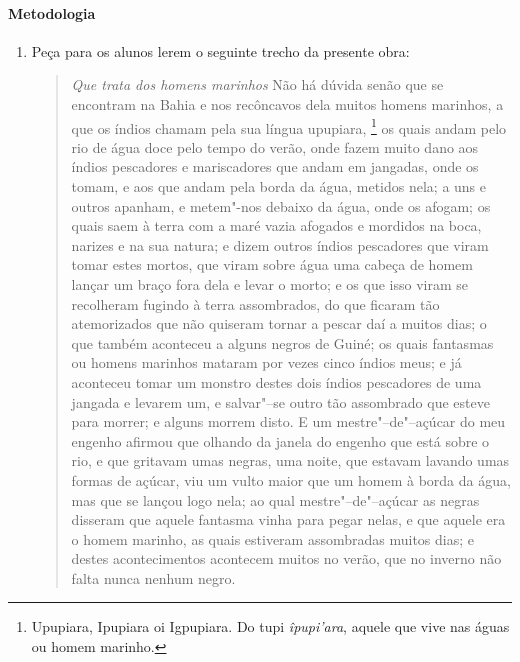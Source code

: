 \documentclass[12pt]{extarticle}
\begin{document}
{\paragraph{Metodologia}

\begin{enumerate}

\item Peça para os alunos lerem o seguinte trecho da presente obra:

\begin{quote} 
\emph{Que trata dos homens marinhos}
Não há dúvida senão que se encontram na Bahia e nos recôncavos dela 
muitos homens marinhos, a que os índios chamam pela sua língua upupiara,
\footnote{Upupiara, Ipupiara oi Igpupiara. Do tupi \textit{îpupi'ara}, 
aquele que vive nas águas ou homem marinho.} os quais andam pelo rio de 
água doce pelo tempo do verão, onde fazem muito dano aos índios
pescadores e mariscadores que andam em jangadas, onde os tomam, e aos que 
andam pela borda da água, metidos nela; a uns e outros apanham, e metem"-nos 
debaixo da água, onde os afogam; os quais saem à terra com a maré vazia 
afogados e mordidos na boca, narizes e na sua natura; e dizem outros índios pescadores que viram tomar estes mortos, que viram sobre água uma cabeça 
de homem lançar um braço fora dela e levar o morto; e os que isso viram 
se recolheram fugindo à terra assombrados, do que ficaram tão atemorizados 
que não quiseram tornar a pescar daí a muitos dias; o que também aconteceu 
a alguns negros de Guiné; os quais fantasmas ou homens marinhos mataram 
por vezes cinco índios meus; e já aconteceu tomar um monstro destes dois 
índios pescadores de uma jangada e levarem um, e salvar"--se outro tão 
assombrado que esteve para morrer; e alguns morrem disto. E um 
mestre"--de"--açúcar do meu engenho afirmou que olhando da janela do engenho 
que está sobre o rio, e que gritavam umas negras, uma noite, que estavam 
lavando umas formas de açúcar, viu um vulto maior que um homem à borda da 
água, mas que se lançou logo nela; ao qual mestre"--de"--açúcar as negras 
disseram que aquele fantasma vinha para pegar nelas, e que aquele era o 
homem marinho, as quais estiveram assombradas muitos dias; e destes 
acontecimentos acontecem muitos no verão, que no inverno não falta nunca 
nenhum negro.
\end{quote}


\end{enumerate}}
\end{document}
